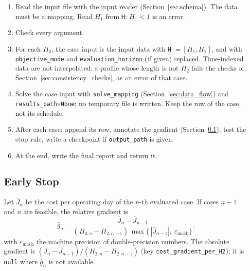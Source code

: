 \begin{enumerate}[nosep,label=\arabic*.]
  \item Read the input file with the input reader (Section~\ref{sec:schema}). The data must be a mapping. Read $H_1$ from \texttt{H}; $H_1 < 1$ is an error.
  \item Check every argument.
  \item For each $H_2$, the case input is the input data with \texttt{H} $= [H_1, H_2]$, and with \texttt{objective\_mode} and \texttt{evaluation\_horizon} (if given) replaced. Time-indexed data are not interpolated: a profile whose length is not $H_2$ fails the checks of Section~\ref{sec:consistency_checks}, as an error of that case.
  \item Solve the case input with \texttt{solve\_mapping} (Section~\ref{sec:data_flow}) and \texttt{results\_path=None}; no temporary file is written. Keep the row of the case, not its schedule.
  \item After each case: append its row, annotate the gradient (Section~\ref{sec:sweep_stop}), test the stop rule, write a checkpoint if \texttt{output\_path} is given.
  \item At the end, write the final report and return it.
\end{enumerate}

\tabend

\subsection{Early Stop}
\label{sec:sweep_stop}

Let $\bar J_n$ be the cost per operating day of the $n$-th evaluated case. If cases $n-1$ and $n$ are feasible, the relative gradient is
\begin{equation}
  \hat g_n = \frac{\bar J_n - \bar J_{n-1}}{(H_{2,n} - H_{2,n-1})\,\max\{\,|\bar J_{n-1}|,\ \varepsilon_{\mathrm{mach}}\}},
  \label{eq:d_gradient}
\end{equation}
with $\varepsilon_{\mathrm{mach}}$ the machine precision of double-precision numbers. The absolute gradient is $(\bar J_n - \bar J_{n-1})/(H_{2,n} - H_{2,n-1})$ (key \texttt{cost\_gradient\_per\_H2}); it is \texttt{null} where $\hat g_n$ is not available.


